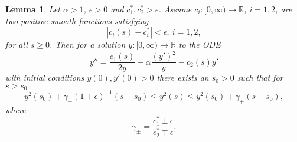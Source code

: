 \documentclass{amsart}
\newtheorem{lem}[thm]{Lemma}
\theoremstyle{definition}
\theoremstyle{remark}
\numberwithin{equation}{section}
\newcommand{\R}{\mathbb{R}}  %
\begin{document}
\begin{lem} 
\label{asymptotics}
Let $\alpha>1$, $\epsilon >0$ and $c_1^{\ast}, c_2^{\ast} > \epsilon$. Assume $c_i: [0, \infty) \rightarrow \R$, $i = 1,2$, are two positive smooth functions satisfying
\begin{equation*}
|c_i(s) - c_i^{\ast}| < \epsilon, \: i = 1,2,
\end{equation*}
for all $s\geq 0$. Then for a solution $y: [0, \infty) \rightarrow \R$ to the ODE
\begin{equation}
\label{ODEasymptotics}
y'' = \frac{c_1(s)}{2y} - \alpha \frac{(y')^2}{y} - c_2(s) y'
\end{equation}
with initial conditions $y(0), y'(0)>0$ there exists an $s_0>0$ such that for $s >s_0$ 
\begin{equation*}
y^2(s_0) + \gamma_-\left(1+\epsilon\right)^{-1} \left(s-s_0\right) \leq y^2(s) \leq y^2(s_0) + \gamma_+ \left(s-s_0\right),
\end{equation*}
where 
\begin{equation*}
\gamma_{\pm} = \frac{c_1^{\ast} \pm \epsilon}{c_2^{\ast}\mp\epsilon}.
\end{equation*}
\end{lem}
\end{document}
